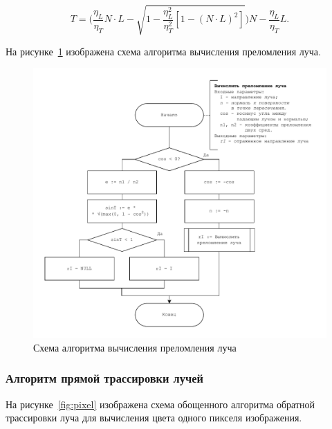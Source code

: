 \begin{equation}
	T = \Bigg(\frac{\eta_L}{\eta_T} N \cdot L - \sqrt{1 - \frac{\eta_L^2}{\eta_T^2}[1 - (N \cdot L)^2]}\Bigg)N - \frac{\eta_L}{\eta_T}L.
\end{equation}

На рисунке~\ref{fig:refr} изображена схема алгоритма вычисления преломления луча.

\newpage
\begin{figure}[ht!]
	\begin{center}
		\includegraphics[scale=1]{diag/main-raytracing-refract.pdf}
	\end{center}
	\caption{Схема алгоритма вычисления преломления луча}
	\label{fig:refr}
\end{figure}

\subsubsection*{Алгоритм прямой трассировки лучей}

На рисунке~\ref{fig:pixel} изображена схема обощенного алгоритма обратной трассировки луча для вычисления цвета одного пикселя изображения.

